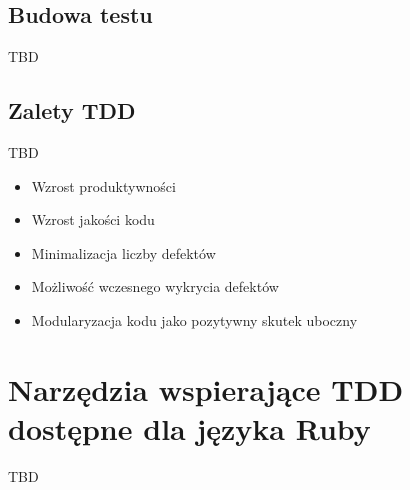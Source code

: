   \subsection{Budowa testu}
    TBD
  \subsection{Zalety TDD}
    TBD
    \begin{itemize}
      \item Wzrost produktywności
      \item Wzrost jakości kodu
      \item Minimalizacja liczby defektów
      \item Możliwość wczesnego wykrycia defektów
      \item Modularyzacja kodu jako pozytywny skutek uboczny
    \end{itemize}

  \section{Narzędzia wspierające TDD dostępne dla języka Ruby}
    TBD

